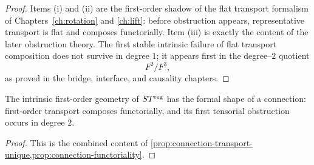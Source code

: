 \begin{proof}
	Items \textup{(i)} and \textup{(ii)} are the first-order shadow of the
	flat transport formalism of Chapters~\ref{ch:rotation} and
	\ref{ch:lift}: before obstruction appears, representative transport is
	flat and composes functorially.
	Item \textup{(iii)} is exactly the content of the later obstruction
	theory.  The first stable intrinsic failure of flat transport
	composition does not survive in degree \(1\); it appears first in the
	degree--\(2\) quotient
	\[
		F^2/F^3,
	\]
	as proved in the bridge, interface, and causality chapters.
\end{proof}
\begin{corollary}
	\label{cor:connection-pattern}
	The intrinsic first-order geometry of \(ST^{\mathrm{reg}}\) has the formal shape
	of a connection: first-order transport composes functorially, and its
	first tensorial obstruction occurs in degree \(2\).
\end{corollary}
\begin{proof}
	This is the combined content of
	\cref{prop:connection-transport-unique,prop:connection-functoriality}.
\end{proof}
